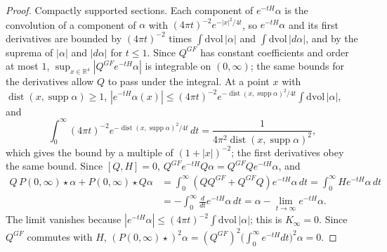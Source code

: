 \begin{proof}
Compactly supported sections. Each component of $e^{-tH}\alpha$ is the convolution of a component of $\alpha$ with $(4\pi t)^{-2}e^{-|x|^2/4t}$, so $e^{-tH}\alpha$ and its first derivatives are bounded by $(4\pi t)^{-2}$ times $\int\mathrm{dvol}\,|\alpha|$ and $\int\mathrm{dvol}\,|d\alpha|$, and by the suprema of $|\alpha|$ and $|d\alpha|$ for $t\le1$. Since $Q^{GF}$ has constant coefficients and order at most $1$, $\sup_{x\in\mathbb R^4}|Q^{GF}e^{-tH}\alpha|$ is integrable on $(0,\infty)$; the same bounds for the derivatives allow $Q$ to pass under the integral. At a point $x$ with $\operatorname{dist}(x,\operatorname{supp}\alpha)\ge1$, $|e^{-tH}\alpha(x)|\le(4\pi t)^{-2}e^{-\operatorname{dist}(x,\operatorname{supp}\alpha)^2/4t}\int\mathrm{dvol}\,|\alpha|$, and
\[
\int_0^\infty(4\pi t)^{-2}e^{-\operatorname{dist}(x,\operatorname{supp}\alpha)^2/4t}\,dt=\frac{1}{4\pi^2\operatorname{dist}(x,\operatorname{supp}\alpha)^2},
\]
which gives the bound by a multiple of $(1+|x|)^{-2}$; the first derivatives obey the same bound. Since $[Q,H]=0$, $Q^{GF}e^{-tH}Q\alpha=Q^{GF}Qe^{-tH}\alpha$, and
\[
\begin{aligned}
Q\,P(0,\infty)\star\alpha+P(0,\infty)\star Q\alpha&=\int_0^\infty(QQ^{GF}+Q^{GF}Q)e^{-tH}\alpha\,dt=\int_0^\infty He^{-tH}\alpha\,dt\\
&=-\int_0^\infty\frac{d}{dt}e^{-tH}\alpha\,dt=\alpha-\lim_{t\to\infty}e^{-tH}\alpha .
\end{aligned}
\]
The limit vanishes because $|e^{-tH}\alpha|\le(4\pi t)^{-2}\int\mathrm{dvol}\,|\alpha|$; this is $K_\infty=0$. Since $Q^{GF}$ commutes with $H$, $(P(0,\infty)\star)^2\alpha=(Q^{GF})^2\big(\int_0^\infty e^{-tH}dt\big)^2\alpha=0$.


\end{proof}
